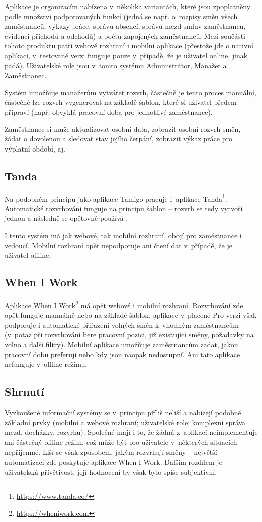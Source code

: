 \documentclass[twoside]{ctuthesis}
\begin{document}
Aplikace je organizacím nabízena v~několika variantách, které jsou zpop\-lat\-ně\-ny podle množství podporovaných funkcí (jedná se např. o~rozpisy směn všech zaměstnanců, výkazy práce, správu absencí, správu mezd smluv zaměstnanců, evidenci příchodů a odchodů) a počtu zapojených zaměstnanců. Mezi součásti tohoto produktu patří webové rozhraní i mobilní aplikace (přestože jde o nativní aplikaci, v~testované verzi funguje pouze v~případě, že je uživatel online, jinak padá). Uživatelské role jsou v~tomto systému Administrátor, Manažer a Zaměstnanec.

Systém umožňuje manažerům vytvářet rozvrh, částečně je tento proces manuální, částečně lze rozvrh vygenerovat na základě šablon, které si uživatel předem připraví (např. obvyklá pracovní doba pro jednotlivé zaměstnance).

Za\-měst\-na\-nec si může aktualizovat osobní data, zobrazit osobní rozvrh směn, žádat o dovolenou a sledovat stav jejího čerpání, zobrazit výkaz práce pro výplatní období, aj.

\subsection{Tanda}
Na podobném principu jako aplikace Tamigo pracuje i~aplikace Tanda\footnote{\url{https://www.tanda.co/}}. Automatické rozvrhování funguje na principu šablon -- rozvrh se tedy vytvoří jednou a následně se opětovně používá \cite{tanda2020rosters}.

I tento systém má jak webové, tak mobilní rozhraní, obojí pro zaměstnance i vedoucí. Mobilní rozhraní opět nepodporuje ani čtení dat v~případě, že je uživatel offline.

\subsection{When I Work}
Aplikace When I Work\footnote{\url{https://wheniwork.com}} má opět webové i mobilní rozhraní. Rozvrhování zde opět funguje manuálně nebo na základě šablon, aplikace v~placené Pro verzi \cite{wheinwork2020pricing} však podporuje i automatické přiřazení volných směn k~vhodným zaměstnancům (v~potaz při rozvrhování bere pracovní pozici, již existující směny, požadavky na volno a další filtry). \cite{wheinwork2020employee} Mobilní aplikace umožňuje zaměstnancům zadat, jakou pracovní dobu preferují nebo kdy jsou naopak nedostupní. Ani tato aplikace nefunguje v~offline režimu.

\subsection{Shrnutí}
Vyzkoušené informační systémy se v~principu příliš neliší a nabízejí podobné základní prvky (mobilní a webové rozhraní; uživatelské role; komplexní správa mezd, docházky, rozvrhů). Společné mají i to, že žádná z~aplikací neimplementuje ani částečný offline režim, což může být pro uživatele v~některých situacích nepříjemné. Liší se však způsobem, jakým rozvrhují směny -- největší automatizaci zde poskytuje aplikace When I Work. Dalším rozdílem je uživatelská přívětivost, její hodnocení by však bylo spíše subjektivní.
\end{document}
